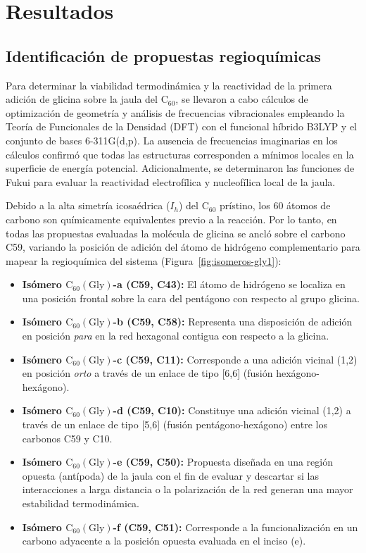 
\chapter{Resultados}
\section{Identificación de propuestas regioquímicas}

Para determinar la viabilidad termodinámica y la reactividad de la primera adición de glicina sobre la jaula del $\text{C}_{60}$, se llevaron a cabo cálculos de optimización de geometría y análisis de frecuencias vibracionales empleando la Teoría de Funcionales de la Densidad (DFT) con el funcional híbrido B3LYP y el conjunto de bases 6-311G(d,p). La ausencia de frecuencias imaginarias en los  cálculos confirmó que todas las estructuras corresponden a mínimos locales en la superficie de energía potencial. Adicionalmente, se determinaron las funciones de Fukui para evaluar la reactividad electrofílica y nucleofílica local de la jaula.

Debido a la alta simetría icosaédrica ($I_h$) del $\text{C}_{60}$ prístino, los 60 átomos de carbono son químicamente equivalentes previo a la reacción. Por lo tanto, en todas las propuestas evaluadas la molécula de glicina se ancló sobre el carbono C59, variando la posición de adición del átomo de hidrógeno complementario para mapear la regioquímica del sistema (Figura~\ref{fig:isomeros-gly1}):

\begin{itemize}
    \item \textbf{Isómero $\text{C}_{60}(\text{Gly})$-a (C59, C43):} El átomo de hidrógeno se localiza en una posición frontal sobre la cara del pentágono con respecto al grupo glicina.
    \item \textbf{Isómero $\text{C}_{60}(\text{Gly})$-b (C59, C58):} Representa una disposición de adición en posición \textit{para} en la red hexagonal contigua con respecto a la glicina.
    \item \textbf{Isómero $\text{C}_{60}(\text{Gly})$-c (C59, C11):} Corresponde a una adición vicinal (1,2) en posición \textit{orto} a través de un enlace de tipo [6,6] (fusión hexágono-hexágono).
    \item \textbf{Isómero $\text{C}_{60}(\text{Gly})$-d (C59, C10):} Constituye una adición vicinal (1,2) a través de un enlace de tipo [5,6] (fusión pentágono-hexágono) entre los carbonos C59 y C10.
    \item \textbf{Isómero $\text{C}_{60}(\text{Gly})$-e (C59, C50):} Propuesta diseñada en una región opuesta (antípoda) de la jaula con el fin de evaluar y descartar si las interacciones a larga distancia o la polarización de la red generan una mayor estabilidad termodinámica.
    \item \textbf{Isómero $\text{C}_{60}(\text{Gly})$-f (C59, C51):} Corresponde a la funcionalización en un carbono adyacente a la posición opuesta evaluada en el inciso (e).
\end{itemize}

